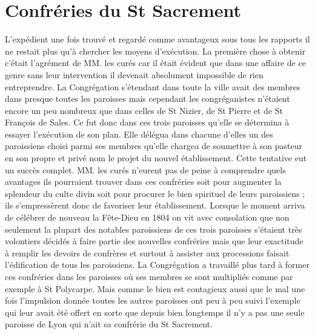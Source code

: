 \section*{Confréries du St Sacrement}
L'expédient une fois trouvé et regardé comme avantageux sous tous les rapports il ne restait plus qu'à chercher les moyens d'exécution. La première chose à obtenir c'était l'agrément de MM. les curés car il était évident que dans une affaire de ce genre sans leur intervention il devenait absolument impossible de rien entreprendre. La Congrégation s'étendant dans toute la ville avait des membres dans presque toutes les paroisses mais cependant les congréganistes n'étaient encore un peu nombreux que dans celles de St Nizier, de St Pierre et de St François de Sales. Ce fut donc dans ces trois paroisses qu'elle se détermina à essayer l'exécution de son plan. Elle délégua dans chacune d'elles un des paroissiens choisi parmi ses membres qu'elle chargea de soumettre à son pasteur en son propre et privé nom le projet du nouvel établissement. Cette tentative eut un succès complet. MM. les curés n'eurent
pas de peine à comprendre quels avantages ils pourraient trouver dans ces confréries soit pour augmenter la splendeur du culte divin soit pour procurer le bien spirituel de leurs paroissiens ; ils s'empressèrent donc de favoriser leur établissement. Lorsque le moment arriva de célébrer de nouveau la Fête-Dieu en 1804 on vit avec consolation que non seulement la plupart des notables paroissiens de ces trois paroisses s'étaient très volontiers décidés à faire partie des nouvelles confréries mais que leur exactitude à remplir les devoirs de confrères et surtout à assister aux processions faisait l'édification de tous les paroissiens. La Congrégation a travaillé plus tard à former ces confréries dans les paroisses où ses membres se sont multipliés comme par exemple à St Polycarpe. Mais comme le bien est contagieux aussi que le mal une fois l'impulsion donnée toutes les autres paroisses ont peu à peu suivi l'exemple qui leur avait été offert en sorte que depuis bien longtemps il n'y a pas une seule paroisse de Lyon qui n'ait sa confrérie du St Sacrement.

